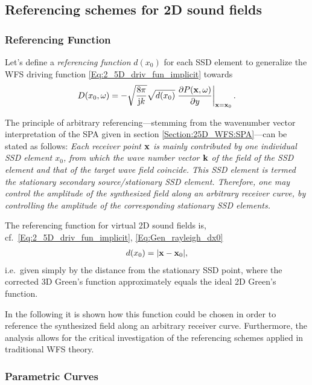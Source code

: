 \subsection{Referencing schemes for 2D sound fields}

\subsubsection{Referencing Function}

Let's define a \emph{referencing function} $d(x_0)$ for each SSD element to generalize the WFS driving function \eqref{Eq:2_5D_driv_fun_implicit} towards
\begin{equation}
D(x_0,\omega) = 
- \sqrt{\frac{8\pi}{\mathrm{j} k}} \sqrt{d(x_0)} \left.
\frac{\partial P(\mathbf{x},\omega)}{\partial y}\right|_{\mathbf{x} = \mathbf{x}_0}.
\label{Eq:Gen_rayleigh_dx0}
\end{equation}

The principle of arbitrary referencing---stemming from the wavenumber vector interpretation of the SPA given in section \ref{Section:25D_WFS:SPA}---can be stated as follows:
\emph{Each receiver point $\mathbf{x}$ is mainly contributed by one individual SSD element $x_0$, from which the wave number vector ${\bf k}$ of the field of the SSD element and that of the target wave field coincide.
This SSD element is termed the stationary secondary source/stationary SSD element.
Therefore, one may control the amplitude of the synthesized field along an arbitrary receiver curve, by controlling the amplitude of the corresponding stationary SSD elements.}

The referencing function for virtual 2D sound fields is, cf.\ \eqref{Eq:2_5D_driv_fun_implicit}, \eqref{Eq:Gen_rayleigh_dx0}
\begin{align}
d(x_0) = |\mathbf{x}-\mathbf{x}_0|,
\label{dx0_2DSources}
\end{align}
i.e.\ given simply by the distance from the stationary SSD point, where the corrected 3D Green's function approximately equals the ideal 2D Green's function.

In the following it is shown how this function could be chosen in order to reference the synthesized field along an arbitrary receiver curve.
Furthermore, the analysis allows for the critical investigation of the referencing schemes applied in traditional WFS theory.

\subsubsection{Parametric Curves}

